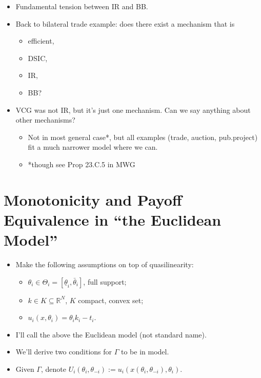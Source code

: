 \documentclass[english,handout,10pt]{beamer}		%
\def\lyxframeend{} %
\begin{document}
\begin{itemize}
	\item Fundamental tension between IR and BB.
	\item Back to bilateral trade example: does there exist a mechanism that is
	\begin{itemize}
		\item efficient,
		\item DSIC,
		\item IR,
		\item BB?
	\end{itemize}
	\pause
	\item VCG was not IR, but it's just one mechanism. Can we say anything about other mechanisms?
	\begin{itemize}
		\item Not in most general case*, but all examples (trade, auction, pub.project) fit a much narrower model where we can.
		\item *though see Prop 23.C.5 in MWG
	\end{itemize}
\end{itemize}
\lyxframeend





\section{Monotonicity and Payoff Equivalence in ``the Euclidean Model''}

\begin{itemize}
	\item Make the following assumptions on top of quasilinearity:
	\begin{itemize}
		\item $\theta_i \in \Theta_{i} = [\underline{\theta}_i, \bar{\theta}_i]$, full support;
		\item $k \in K \subseteq \mathbb{R}^N$, $K$ compact, convex set;
		\item $u_i(x,\theta_i) = \theta_i k_i - t_i$.
	\end{itemize}
	\item I'll call the above \alert{the Euclidean model} (not standard name).
	\item We'll derive two  conditions for $\Gamma$ to be  in  model.
	\item Given $\Gamma$, denote $U_i(\theta_i, \theta_{-i}) := u_i\left(x(\theta_i, \theta_{-i}), \theta_i \right)$.
\end{itemize}
\lyxframeend
\end{document}
